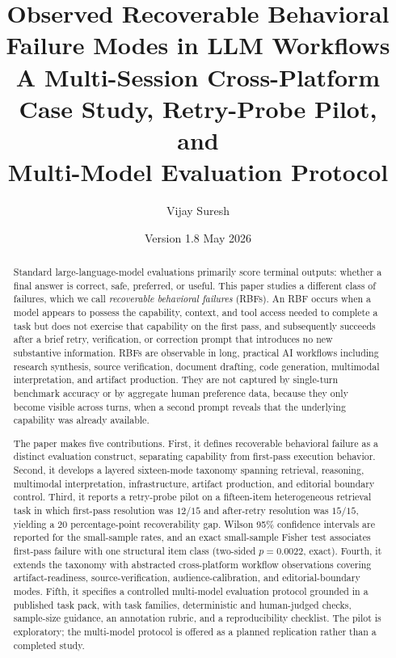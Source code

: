 \documentclass[11pt]{article}
\title{\textbf{Observed Recoverable Behavioral Failure Modes in LLM Workflows}\\
       \large A Multi-Session Cross-Platform Case Study, Retry-Probe Pilot, and\\
       Multi-Model Evaluation Protocol}
\author{Vijay Suresh}
\date{Version 1.8 \quad May 2026}
\begin{document}
\maketitle

\begin{abstract}
Standard large-language-model evaluations primarily score terminal outputs: whether a final answer is correct, safe, preferred, or useful. This paper studies a different class of failures, which we call \emph{recoverable behavioral failures} (RBFs). An RBF occurs when a model appears to possess the capability, context, and tool access needed to complete a task but does not exercise that capability on the first pass, and subsequently succeeds after a brief retry, verification, or correction prompt that introduces no new substantive information. RBFs are observable in long, practical AI workflows including research synthesis, source verification, document drafting, code generation, multimodal interpretation, and artifact production. They are not captured by single-turn benchmark accuracy or by aggregate human preference data, because they only become visible across turns, when a second prompt reveals that the underlying capability was already available.

The paper makes five contributions. First, it defines recoverable behavioral failure as a distinct evaluation construct, separating capability from first-pass execution behavior. Second, it develops a layered sixteen-mode taxonomy spanning retrieval, reasoning, multimodal interpretation, infrastructure, artifact production, and editorial boundary control. Third, it reports a retry-probe pilot on a fifteen-item heterogeneous retrieval task in which first-pass resolution was $12/15$ and after-retry resolution was $15/15$, yielding a $20$ percentage-point recoverability gap. Wilson 95\% confidence intervals are reported for the small-sample rates, and an exact small-sample Fisher test associates first-pass failure with one structural item class (two-sided $p = 0.0022$, exact). Fourth, it extends the taxonomy with abstracted cross-platform workflow observations covering artifact-readiness, source-verification, audience-calibration, and editorial-boundary modes. Fifth, it specifies a controlled multi-model evaluation protocol grounded in a published task pack, with task families, deterministic and human-judged checks, sample-size guidance, an annotation rubric, and a reproducibility checklist. The pilot is exploratory; the multi-model protocol is offered as a planned replication rather than a completed study.
\end{abstract}
\end{document}

